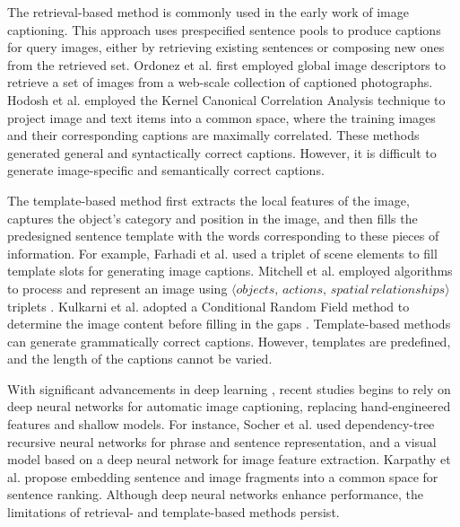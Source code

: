 \documentclass[conference]{IEEEtran}
\begin{document}
The retrieval-based method is commonly used in the early work of image captioning. This approach uses prespecified sentence pools to produce captions for query images, either by retrieving existing sentences or composing new ones from the retrieved set. Ordonez et al. \cite{ordonez2011im2text} first employed global image descriptors to retrieve a set of images from a web-scale collection of captioned photographs. Hodosh et al. \cite{hodosh2013framing} employed the Kernel Canonical Correlation Analysis technique \cite{bach2002kernel, hardoon2004canonical} to project image and text items into a common space, where the training images and their corresponding captions are maximally correlated. These methods generated general and syntactically correct captions. However, it is difficult to generate image-specific and semantically correct captions.


The template-based method first extracts the local features of the image, captures the object’s category and position in the image, and then fills the predesigned sentence template with the words corresponding to these pieces of information. For example, Farhadi et al. \cite{farhadi2010every} used a triplet of scene elements to fill template slots for generating image captions. Mitchell et al. employed algorithms to process and represent an image using $\langle objects,\, actions,\, spatial\, relationships \rangle$ triplets \cite{mitchell2012midge}. Kulkarni et al. adopted a Conditional Random Field method to determine the image content before filling in the gaps \cite{kulkarni2013babytalk}. Template-based methods can generate grammatically correct captions. However, templates are predefined, and the length of the captions cannot be varied.


With significant advancements in deep learning \cite{bengio2013representation}, recent studies begins to rely on deep neural networks for automatic image captioning, replacing hand-engineered features and shallow models. For instance, Socher et al. \cite{socher2014grounded} used dependency-tree recursive neural networks for phrase and sentence representation, and a visual model based on a deep neural network for image feature extraction. Karpathy et al. \cite{karpathy2015deep} propose embedding sentence and image fragments into a common space for sentence ranking. Although deep neural networks enhance performance, the limitations of retrieval- and template-based methods persist.
\end{document}
